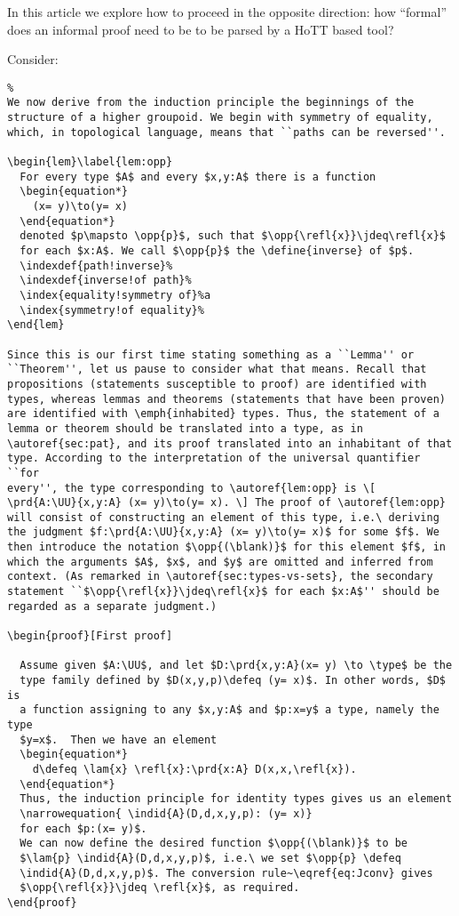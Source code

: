 \documentclass[a4paper]{amsart}
\begin{document}
In this article we explore how to proceed in the opposite direction: 
how ``formal'' does an informal proof need to be to be parsed by a HoTT 
based tool?

Consider:
%
\begin{verbatim}
%
We now derive from the induction principle the beginnings of the 
structure of a higher groupoid. We begin with symmetry of equality, 
which, in topological language, means that ``paths can be reversed''.

\begin{lem}\label{lem:opp}
  For every type $A$ and every $x,y:A$ there is a function
  \begin{equation*}
    (x= y)\to(y= x)
  \end{equation*}
  denoted $p\mapsto \opp{p}$, such that $\opp{\refl{x}}\jdeq\refl{x}$ 
  for each $x:A$. We call $\opp{p}$ the \define{inverse} of $p$.
  \indexdef{path!inverse}%
  \indexdef{inverse!of path}%
  \index{equality!symmetry of}%a
  \index{symmetry!of equality}%
\end{lem}

Since this is our first time stating something as a ``Lemma'' or 
``Theorem'', let us pause to consider what that means. Recall that 
propositions (statements susceptible to proof) are identified with 
types, whereas lemmas and theorems (statements that have been proven) 
are identified with \emph{inhabited} types. Thus, the statement of a 
lemma or theorem should be translated into a type, as in 
\autoref{sec:pat}, and its proof translated into an inhabitant of that 
type. According to the interpretation of the universal quantifier ``for 
every'', the type corresponding to \autoref{lem:opp} is \[ 
\prd{A:\UU}{x,y:A} (x= y)\to(y= x). \] The proof of \autoref{lem:opp} 
will consist of constructing an element of this type, i.e.\ deriving 
the judgment $f:\prd{A:\UU}{x,y:A} (x= y)\to(y= x)$ for some $f$. We 
then introduce the notation $\opp{(\blank)}$ for this element $f$, in 
which the arguments $A$, $x$, and $y$ are omitted and inferred from 
context. (As remarked in \autoref{sec:types-vs-sets}, the secondary 
statement ``$\opp{\refl{x}}\jdeq\refl{x}$ for each $x:A$'' should be 
regarded as a separate judgment.)

\begin{proof}[First proof]

  Assume given $A:\UU$, and let $D:\prd{x,y:A}(x= y) \to \type$ be the 
  type family defined by $D(x,y,p)\defeq (y= x)$. In other words, $D$ is 
  a function assigning to any $x,y:A$ and $p:x=y$ a type, namely the type 
  $y=x$.  Then we have an element
  \begin{equation*}
    d\defeq \lam{x} \refl{x}:\prd{x:A} D(x,x,\refl{x}).
  \end{equation*}
  Thus, the induction principle for identity types gives us an element
  \narrowequation{ \indid{A}(D,d,x,y,p): (y= x)}
  for each $p:(x= y)$.
  We can now define the desired function $\opp{(\blank)}$ to be 
  $\lam{p} \indid{A}(D,d,x,y,p)$, i.e.\ we set $\opp{p} \defeq 
  \indid{A}(D,d,x,y,p)$. The conversion rule~\eqref{eq:Jconv} gives 
  $\opp{\refl{x}}\jdeq \refl{x}$, as required.
\end{proof}


\end{verbatim}
\end{document}
